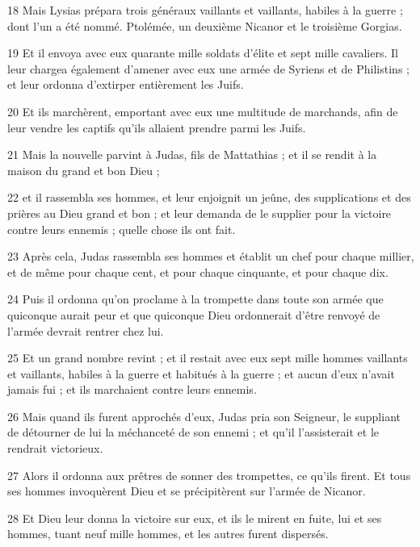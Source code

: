 \par 18 Mais Lysias prépara trois généraux vaillants et vaillants, habiles à la guerre ; dont l'un a été nommé. Ptolémée, un deuxième Nicanor et le troisième Gorgias.

\par 19 Et il envoya avec eux quarante mille soldats d'élite et sept mille cavaliers. Il leur chargea également d'amener avec eux une armée de Syriens et de Philistins ; et leur ordonna d'extirper entièrement les Juifs.

\par 20 Et ils marchèrent, emportant avec eux une multitude de marchands, afin de leur vendre les captifs qu'ils allaient prendre parmi les Juifs.

\par 21 Mais la nouvelle parvint à Judas, fils de Mattathias ; et il se rendit à la maison du grand et bon Dieu ;

\par 22 et il rassembla ses hommes, et leur enjoignit un jeûne, des supplications et des prières au Dieu grand et bon ; et leur demanda de le supplier pour la victoire contre leurs ennemis ; quelle chose ils ont fait.

\par 23 Après cela, Judas rassembla ses hommes et établit un chef pour chaque millier, et de même pour chaque cent, et pour chaque cinquante, et pour chaque dix.

\par 24 Puis il ordonna qu'on proclame à la trompette dans toute son armée que quiconque aurait peur et que quiconque Dieu ordonnerait d'être renvoyé de l'armée devrait rentrer chez lui.

\par 25 Et un grand nombre revint ; et il restait avec eux sept mille hommes vaillants et vaillants, habiles à la guerre et habitués à la guerre ; et aucun d’eux n’avait jamais fui ; et ils marchaient contre leurs ennemis.

\par 26 Mais quand ils furent approchés d'eux, Judas pria son Seigneur, le suppliant de détourner de lui la méchanceté de son ennemi ; et qu'il l'assisterait et le rendrait victorieux.

\par 27 Alors il ordonna aux prêtres de sonner des trompettes, ce qu'ils firent. Et tous ses hommes invoquèrent Dieu et se précipitèrent sur l'armée de Nicanor.

\par 28 Et Dieu leur donna la victoire sur eux, et ils le mirent en fuite, lui et ses hommes, tuant neuf mille hommes, et les autres furent dispersés.

